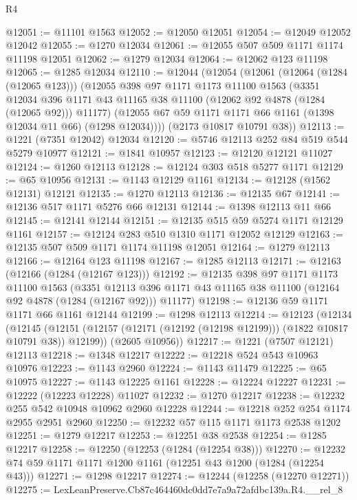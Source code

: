 \begin{lexlean}{R4}
\begin{coremodule}
@12051 := @11101 @1563
@12052 := @12050 @12051
@12054 := @12049 @12052 @12042
@12055 := @1270 @12034
@12061 := @12055 @507 @509 @1171 @1174 @11198 @12051
@12062 := @1279 @12034
@12064 := @12062 @123 @11198
@12065 := @1285 @12034
@12110 := @12044
    (@12054
      (@12061
        (@12064 (@1284 (@12065 @123)))
        (@12055
          @398
          @97
          @1171
          @1173
          @11100
          @1563
          (@3351
            @12034
            @396
            @1171
            @43
            @11165
            @38
            @11100
            (@12062 @92 @4878 (@1284 (@12065 @92)))
            @11177)
          (@12055 @67 @59 @1171 @1171 @66 @1161 (@1398 @12034 @11 @66) (@1298 @12034))))
      (@2173 @10817 @10791 @38))
@12113 := @1221 (@7351 @12042) @12034
@12120 := @5746 @12113 @252 @84 @519 @544 @5279 @10977
@12121 := @1841 @10957
@12123 := @12120 @12121 @11027
@12124 := @1260 @12113
@12128 := @12124 @303 @518 @5277 @1171
@12129 := @65 @10956
@12131 := @1143 @12129 @1161
@12134 := @12128 (@1562 @12131) @12121
@12135 := @1270 @12113
@12136 := @12135 @67
@12141 := @12136 @517 @1171 @5276 @66 @12131
@12144 := @1398 @12113 @11 @66
@12145 := @12141 @12144
@12151 := @12135 @515 @59 @5274 @1171 @12129 @1161
@12157 := @12124 @283 @510 @1310 @1171 @12052 @12129
@12163 := @12135 @507 @509 @1171 @1174 @11198 @12051
@12164 := @1279 @12113
@12166 := @12164 @123 @11198
@12167 := @1285 @12113
@12171 := @12163 (@12166 (@1284 (@12167 @123)))
@12192 := @12135
    @398
    @97
    @1171
    @1173
    @11100
    @1563
    (@3351 @12113 @396 @1171 @43 @11165 @38 @11100 (@12164 @92 @4878 (@1284 (@12167 @92))) @11177)
@12198 := @12136 @59 @1171 @1171 @66 @1161 @12144
@12199 := @1298 @12113
@12214 := @12123
    (@12134
      (@12145 (@12151 (@12157 (@12171 (@12192 (@12198 @12199))) (@1822 @10817 @10791 @38)) @12199))
      (@2605 @10956))
@12217 := @1221 (@7507 @12121) @12113
@12218 := @1348 @12217
@12222 := @12218 @524 @543 @10963 @10976
@12223 := @1143 @2960
@12224 := @1143 @11479
@12225 := @65 @10975
@12227 := @1143 @12225 @1161
@12228 := @12224 @12227
@12231 := @12222 (@12223 @12228) @11027
@12232 := @1270 @12217
@12238 := @12232 @255 @542 @10948 @10962 @2960 @12228
@12244 := @12218 @252 @254 @1174 @2955 @2951 @2960
@12250 := @12232 @57 @115 @1171 @1173 @2538 @1202
@12251 := @1279 @12217
@12253 := @12251 @38 @2538
@12254 := @1285 @12217
@12258 := @12250 (@12253 (@1284 (@12254 @38)))
@12270 := @12232 @74 @59 @1171 @1171 @1200 @1161 (@12251 @43 @1200 (@1284 (@12254 @43)))
@12271 := @1298 @12217
@12274 := @12244 (@12258 (@12270 @12271))
@12275 := LexLeanPreserve.Cb87c464460dc0dd7e7a9a72afdbc139a.R4.__rel_8

\end{coremodule}
\end{lexlean}
